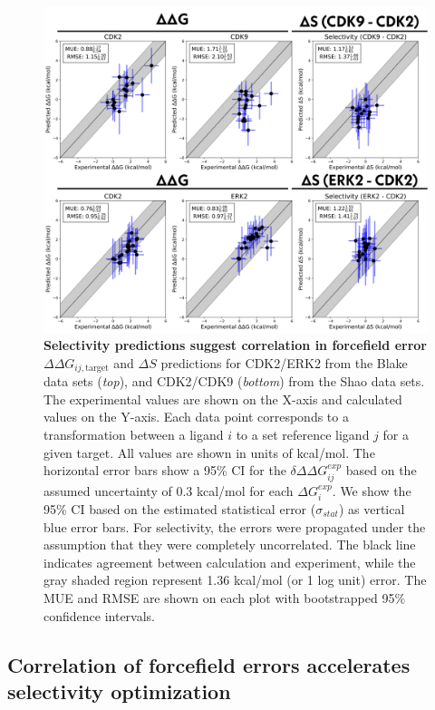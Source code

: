 \documentclass[phd,tocprelim]{cornell}
\begin{document}
\begin{landscape}
\begin{figure}
\centering
\includegraphics[width=0.6\linewidth]{figures/Figure4.png}
\caption[Selectivity predictions suggest correlation in forcefield error.]{
{\bf Selectivity predictions suggest correlation in forcefield error} \\
$\Delta \Delta G_{ij, \text{target}}$ and $\Delta S$ predictions for CDK2/ERK2 from the Blake data sets (\emph{top}), and CDK2/CDK9 (\emph{bottom}) from the Shao data sets. The experimental values are shown on the X-axis and calculated values on the Y-axis. Each data point corresponds to a transformation between a ligand $i$ to a set reference ligand $j$ for a given target. All values are shown in units of kcal/mol. The horizontal error bars show a 95\% CI for the $\delta \Delta \Delta G^{exp}_{ij}$ based on the assumed uncertainty of 0.3 kcal/mol\citep{BROWN2009420,Kalliokoski:PloSOne:2013} for each $\Delta G^{exp}_{i}$. We show the 95\% CI based on the estimated statistical error ($\sigma_{stat}$) as vertical blue error bars. For selectivity, the errors were propagated under the assumption that they were completely uncorrelated. The black line indicates agreement between calculation and experiment, while the gray shaded region represent 1.36 kcal/mol (or 1 log unit) error. The MUE and RMSE are shown on each plot with bootstrapped 95$\%$ confidence intervals.
}
\label{fig:figure-4}
\end{figure}
\end{landscape}

\subsection{Correlation of forcefield errors accelerates selectivity optimization}
\end{document}
